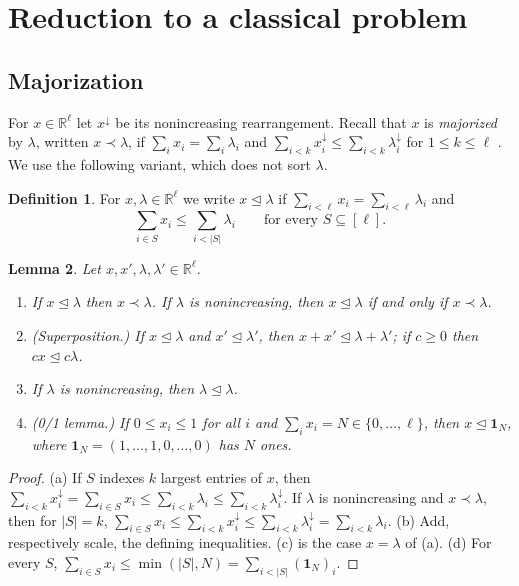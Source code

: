 \documentclass[11pt]{amsart}
\newtheorem{lemma}{Lemma}[section]
\theoremstyle{definition}
\newtheorem{definition}[lemma]{Definition}
\theoremstyle{remark}
\numberwithin{equation}{section}
\newcommand{\R}{\mathbb{R}}
\newcommand{\dom}{\trianglelefteq}
\begin{document}
\section{Reduction to a classical problem}\label{sec:reduction}

\subsection{Majorization}
For $x\in\R^\ell$ let $x^\downarrow$ be its nonincreasing rearrangement. Recall that $x$ is
\emph{majorized} by $\lambda$, written $x\prec\lambda$, if $\sum_i x_i=\sum_i\lambda_i$ and
$\sum_{i<k}x^\downarrow_i\le\sum_{i<k}\lambda^\downarrow_i$ for $1\le k\le\ell$ \cite{MarshallOlkinArnold2011}.
We use the following variant, which does not sort $\lambda$.

\begin{definition}\label{def:dom}
For $x,\lambda\in\R^\ell$ we write $x\dom\lambda$ if $\sum_{i<\ell}x_i=\sum_{i<\ell}\lambda_i$ and
\[
  \sum_{i\in S}x_i\le\sum_{i<|S|}\lambda_i\qquad\text{for every }S\subseteq[\ell] .
\]
\end{definition}

\begin{lemma}\label{lem:dom}
Let $x,x',\lambda,\lambda'\in\R^\ell$.
\begin{enumerate}
\item[(a)] If $x\dom\lambda$ then $x\prec\lambda$. If $\lambda$ is nonincreasing, then
$x\dom\lambda$ if and only if $x\prec\lambda$.
\item[(b)] \textup{(Superposition.)} If $x\dom\lambda$ and $x'\dom\lambda'$, then
$x+x'\dom\lambda+\lambda'$; if $c\ge0$ then $cx\dom c\lambda$.
\item[(c)] If $\lambda$ is nonincreasing, then $\lambda\dom\lambda$.
\item[(d)] \textup{(0/1 lemma.)} If $0\le x_i\le1$ for all $i$ and $\sum_i x_i=N\in\{0,\dots,\ell\}$,
then $x\dom\mathbf 1_N$, where $\mathbf 1_N=(1,\dots,1,0,\dots,0)$ has $N$ ones.
\end{enumerate}
\end{lemma}

\begin{proof}
(a) If $S$ indexes $k$ largest entries of $x$, then
$\sum_{i<k}x^\downarrow_i=\sum_{i\in S}x_i\le\sum_{i<k}\lambda_i\le\sum_{i<k}\lambda^\downarrow_i$.
If $\lambda$ is nonincreasing and $x\prec\lambda$, then for $|S|=k$,
$\sum_{i\in S}x_i\le\sum_{i<k}x^\downarrow_i\le\sum_{i<k}\lambda^\downarrow_i=\sum_{i<k}\lambda_i$.
(b) Add, respectively scale, the defining inequalities. (c) is the case $x=\lambda$ of (a).
(d) For every $S$, $\sum_{i\in S}x_i\le\min(|S|,N)=\sum_{i<|S|}(\mathbf 1_N)_i$.
\end{proof}
\end{document}
